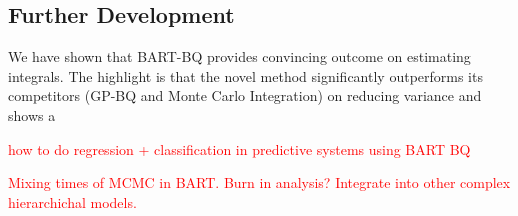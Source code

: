 





\subsection{Further Development}

We have shown that BART-BQ provides convincing outcome on estimating integrals. The highlight is that the novel method significantly outperforms its competitors (GP-BQ and Monte Carlo Integration) on reducing variance and shows a 

\textcolor{red}{how to do regression + classification in predictive systems using BART BQ}

\textcolor{red}{
    Mixing times of MCMC in BART. Burn in analysis? Integrate into other complex hierarchichal models.
}

